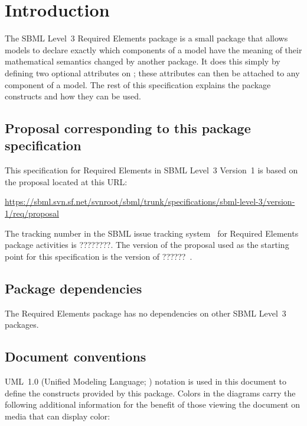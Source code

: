 
\section{Introduction}
\label{intro}

The SBML Level~3 Required Elements package is a small package that allows models to declare exactly which components of a model have the meaning of their mathematical semantics changed by another package.  It does this simply by defining two optional attributes on \SBase; these attributes can then be attached to any component of a model.  The rest of this specification explains the package constructs and how they can be used.


\subsection{Proposal corresponding to this package specification}

This specification for Required Elements in SBML Level~3 Version~1 is based on the proposal located at this URL:

\begin{center}
  \vspace*{1ex}\small
  \url{https://sbml.svn.sf.net/svnroot/sbml/trunk/specifications/sbml-level-3/version-1/req/proposal}
  \vspace*{1ex}
\end{center}

The tracking number in the SBML issue tracking system~\citep{tracker} for Required Elements package activities is ????????.  The version of the proposal used as the starting point for this specification is the version of ??????~\citep{}.


\subsection{Package dependencies}

The Required Elements package has no dependencies on other SBML Level~3 packages.


\subsection{Document conventions}
\label{conventions}

UML~1.0 (Unified Modeling Language; \citealt{eriksson:1998, oestereich:1999}) notation is used in this document to define the constructs provided by this package.  Colors in the diagrams carry the following additional information for the benefit of those viewing the document on media that can display color:


